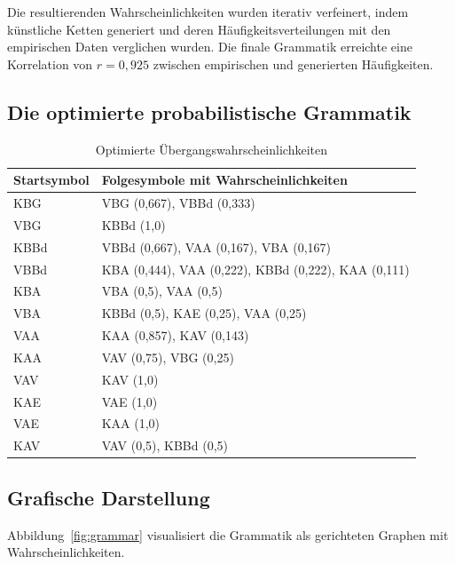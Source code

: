 \documentclass[12pt,a4paper]{article}
\begin{document}
Die resultierenden Wahrscheinlichkeiten wurden iterativ verfeinert, indem
künstliche Ketten generiert und deren Häufigkeitsverteilungen mit den empirischen
Daten verglichen wurden. Die finale Grammatik erreichte eine Korrelation von
\(r = 0,925\) zwischen empirischen und generierten Häufigkeiten.

\subsection{Die optimierte probabilistische Grammatik}

\begin{table}[H]
\centering
\caption{Optimierte Übergangswahrscheinlichkeiten}
\label{tab:grammar}
\begin{tabular}{@{} l l @{}}
\toprule
\textbf{Startsymbol} & \textbf{Folgesymbole mit Wahrscheinlichkeiten} \\
\midrule
KBG & VBG (0,667), VBBd (0,333) \\
VBG & KBBd (1,0) \\
KBBd & VBBd (0,667), VAA (0,167), VBA (0,167) \\
VBBd & KBA (0,444), VAA (0,222), KBBd (0,222), KAA (0,111) \\
KBA & VBA (0,5), VAA (0,5) \\
VBA & KBBd (0,5), KAE (0,25), VAA (0,25) \\
VAA & KAA (0,857), KAV (0,143) \\
KAA & VAV (0,75), VBG (0,25) \\
VAV & KAV (1,0) \\
KAE & VAE (1,0) \\
VAE & KAA (1,0) \\
KAV & VAV (0,5), KBBd (0,5) \\
\bottomrule
\end{tabular}
\end{table}

\subsection{Grafische Darstellung}

Abbildung~\ref{fig:grammar} visualisiert die Grammatik als gerichteten Graphen
mit Wahrscheinlichkeiten.
\end{document}

